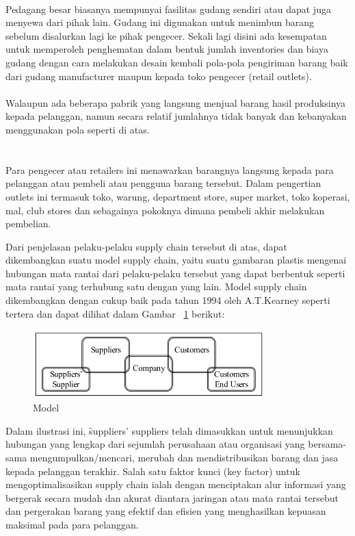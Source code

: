 \\
Pedagang besar biasanya mempunyai fasilitas gudang sendiri atau dapat juga menyewa dari pihak lain. Gudang ini digunakan untuk menimbun barang sebelum disalurkan lagi ke pihak pengecer. Sekali lagi disini ada kesempatan untuk memperoleh penghematan dalam bentuk jumlah inventories dan biaya gudang dengan cara melakukan desain kembali pola-pola pengiriman barang baik dari gudang manufacturer maupun kepada toko pengecer (retail outlets). \\ \\
Walaupun ada beberapa pabrik yang langsung menjual barang hasil produksinya kepada pelanggan, namun secara relatif jumlahnya tidak banyak dan kebanyakan menggunakan pola seperti di atas.\\ \\
\\
Para pengecer atau retailers ini menawarkan barangnya langsung kepada para pelanggan atau pembeli atau pengguna barang tersebut. Dalam pengertian outlets ini termasuk toko, warung, department store, super market, toko koperasi, mal, club stores dan sebagainya pokoknya dimana pembeli akhir melakukan pembelian.

Dari penjelasan pelaku-pelaku supply chain tersebut di atas, dapat dikembangkan suatu model supply chain, yaitu suatu gambaran plastis mengenai hubungan mata rantai dari pelaku-pelaku tersebut yang dapat berbentuk seperti mata rantai yang terhubung satu dengan yang lain. Model supply chain dikembangkan dengan cukup baik pada tahun 1994 oleh A.T.Kearney seperti tertera dan dapat dilihat dalam Gambar \pic~\ref{fig:modelSCM} berikut:
\begin{figure}
	\centering
	\includegraphics[width=0.80\textwidth]
		{pics/model_scm.png}
	\caption{Model \SCM}
	\label{fig:modelSCM}
\end{figure}

Dalam ilustrasi ini, \f{suppliers' suppliers} telah dimasukkan untuk menunjukkan hubungan yang lengkap dari sejumlah perusahaan atau organisasi yang bersama-sama mengumpulkan/mencari, merubah dan mendistribusikan barang dan jasa kepada pelanggan terakhir. Salah satu faktor kunci (key factor) untuk mengoptimalisasikan supply chain ialah dengan menciptakan alur informasi yang bergerak secara mudah dan akurat diantara jaringan atau mata rantai tersebut dan pergerakan barang yang efektif dan efisien yang menghasilkan kepuasan maksimal pada para pelanggan. 

